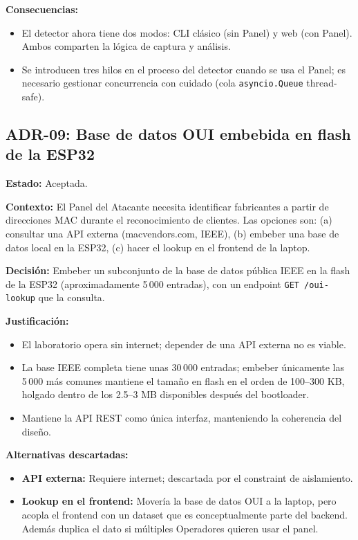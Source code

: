 \documentclass[11pt,a4paper]{article}
\begin{document}
\textbf{Consecuencias:}

\begin{itemize}
  \item El detector ahora tiene dos modos: CLI clásico (sin Panel) y
    web (con Panel). Ambos comparten la lógica de captura y análisis.
  \item Se introducen tres hilos en el proceso del detector cuando se
    usa el Panel; es necesario gestionar concurrencia con cuidado
    (cola \texttt{asyncio.Queue} thread-safe).
\end{itemize}

\subsection{ADR-09: Base de datos OUI embebida en flash de la ESP32}

\textbf{Estado:} Aceptada.

\textbf{Contexto:} El Panel del Atacante necesita identificar
fabricantes a partir de direcciones MAC durante el reconocimiento de
clientes. Las opciones son: (a) consultar una API externa
(macvendors.com, IEEE), (b) embeber una base de datos local en la
ESP32, (c) hacer el lookup en el frontend de la laptop.

\textbf{Decisión:} Embeber un subconjunto de la base de datos pública
IEEE en la flash de la ESP32 (aproximadamente 5\,000 entradas), con un
endpoint \texttt{GET /oui-lookup} que la consulta.

\textbf{Justificación:}

\begin{itemize}
  \item El laboratorio opera sin internet; depender de una API externa
    no es viable.
  \item La base IEEE completa tiene unas 30\,000 entradas; embeber
    únicamente las 5\,000 más comunes mantiene el tamaño en flash en
    el orden de 100--300 KB, holgado dentro de los 2.5--3 MB
    disponibles después del bootloader.
  \item Mantiene la API REST como única interfaz, manteniendo la
    coherencia del diseño.
\end{itemize}

\textbf{Alternativas descartadas:}

\begin{itemize}
  \item \textbf{API externa:} Requiere internet; descartada por el
    constraint de aislamiento.
  \item \textbf{Lookup en el frontend:} Movería la base de datos OUI
    a la laptop, pero acopla el frontend con un dataset que es
    conceptualmente parte del backend. Además duplica el dato si
    múltiples Operadores quieren usar el panel.
\end{itemize}
\end{document}
